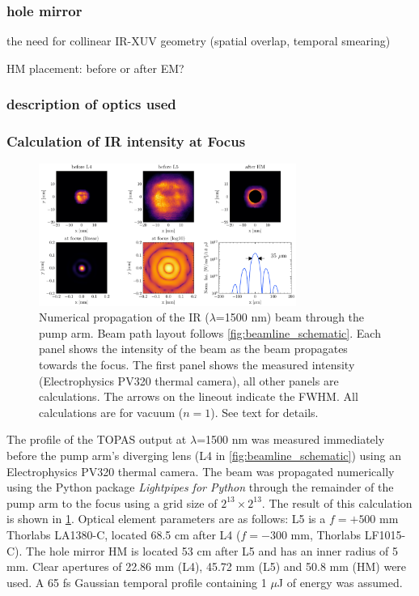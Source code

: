 \subsubsection{hole mirror}
the need for collinear IR-XUV geometry (spatial overlap, temporal smearing)

HM placement: before or after EM?

\subsubsection{description of optics used}

\subsubsection{Calculation of IR intensity at Focus}

\begin{figure}
	\centering
	\includegraphics[width=0.75\textwidth]{figures/chap2/pump_on_focus_calculation_8192_inferno.pdf}
	\caption{Numerical propagation of the IR ($\lambda$=1500 nm) beam through the pump arm. Beam path layout follows \cref{fig:beamline_schematic}. Each panel shows the intensity of the beam as the beam propagates towards the focus. The first panel shows the measured intensity (Electrophysics PV320 thermal camera), all other panels are calculations. The arrows on the lineout indicate the FWHM. All calculations are for vacuum ($n=1$). See text for details.}
	\label{fig:pump_on_focus_calculation}
\end{figure}

The profile of the TOPAS output at $\lambda$=1500 nm was measured immediately before the pump arm's diverging lens (L4 in \cref{fig:beamline_schematic}) using an Electrophysics PV320 thermal camera. The beam was propagated numerically using the Python package \textit{Lightpipes for Python} \cite{vdovinLightPipesPython} through the remainder of the pump arm to the focus using a grid size of $2^{13}\times2^{13}$. The result of this calculation is shown in \cref{fig:pump_on_focus_calculation}. Optical element parameters are as follows: L5 is a $f = +500 \text{ mm}$ Thorlabs LA1380-C, located 68.5 cm after L4 ($f = -300 \text{ mm}$, Thorlabs LF1015-C). The hole mirror HM is located 53 cm after L5 and has an inner radius of 5 mm. Clear apertures of 22.86 mm (L4), 45.72 mm (L5) and 50.8 mm (HM) were used. A 65 fs Gaussian temporal profile containing 1 $\mu$J of energy was assumed.

